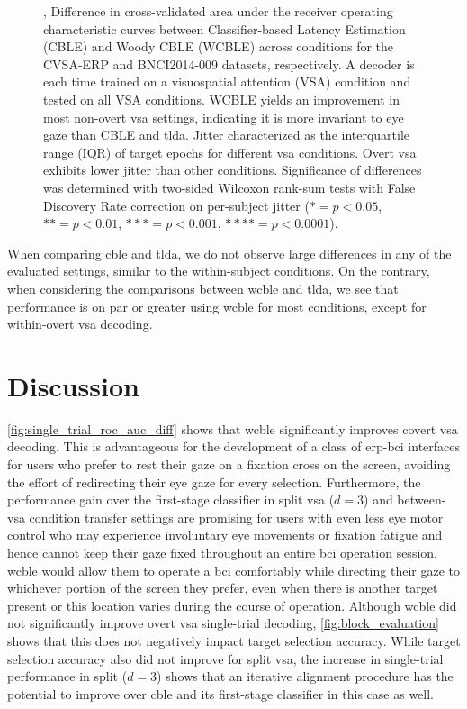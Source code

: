 \begin{figure}
  \caption[Cross-condition classifier performance and estimated jitter.]{
		,
    Difference in cross-validated area under the receiver
		operating characteristic curves between Classifier-based Latency Estimation
    (CBLE) and Woody CBLE (WCBLE) across conditions for the CVSA-ERP and
    BNCI2014-009 datasets, respectively.
    A decoder is each	time trained on a visuospatial attention (VSA) condition
    and tested on all VSA conditions.
    WCBLE yields an improvement in most
		non-overt \ac{vsa} settings, indicating it is more invariant to eye gaze than
    CBLE and \ac{tlda}.
		 Jitter characterized as the interquartile range (IQR)
		of target epochs for different \ac{vsa} conditions. Overt \ac{vsa} exhibits lower
    jitter than other conditions.
    Significance of differences
    was determined with two-sided Wilcoxon rank-sum tests with False Discovery
    Rate correction on per-subject jitter ($*= p<0.05$, $**=p<0.01$,
    $***=p<0.001$, $****=p<0.0001$).
	}
\end{figure}
When comparing \ac{cble} and \ac{tlda}, we do not observe large differences in any of the
evaluated settings, similar to the within-subject conditions.
On the contrary, when considering the comparisons between \ac{wcble} and \ac{tlda}, we
see that performance is on par or greater using \ac{wcble} for most conditions,
except for within-overt \ac{vsa} decoding.

\section{Discussion}

\cref{fig:single_trial_roc_auc_diff} shows that \ac{wcble} significantly improves
covert \ac{vsa} decoding.
This is advantageous for the development of a class of \ac{erp}-\ac{bci} interfaces for
users who prefer to rest their gaze on a fixation cross on the screen,
avoiding the effort of redirecting their eye gaze for every selection.
Furthermore, the performance gain over the first-stage classifier in split
\ac{vsa} ($d=3$) and between-\ac{vsa} condition transfer settings are promising for
users with even less eye motor control who may experience involuntary eye
movements or fixation fatigue and hence cannot keep their gaze fixed throughout an
entire \ac{bci} operation session.
\ac{wcble} would allow them to operate a \ac{bci} comfortably while directing
their gaze to whichever portion of the screen they prefer, even when there is
another target present or this location varies during the
course of operation.
Although \ac{wcble} did not significantly improve overt \ac{vsa} single-trial decoding,
\cref{fig:block_evaluation} shows that this does not negatively impact target
selection accuracy.
While target selection accuracy also did not improve for split \ac{vsa}, the
increase in single-trial performance in split ($d=3$) shows that an iterative
alignment procedure has the potential to improve over \ac{cble} and its first-stage
classifier in this case as well.


